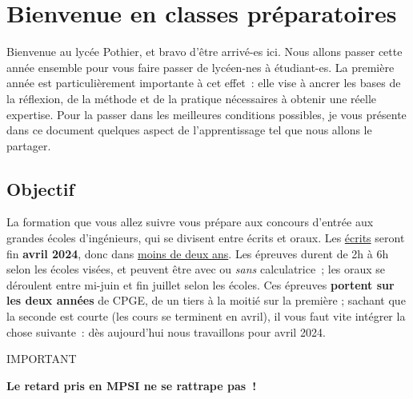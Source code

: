 \documentclass[a4paper, 12pt, final, garamond]{book}
\begin{document}
\setcounter{chapter}{-1}

\chapter*{Bienvenue en classes pr\'eparatoires}

Bienvenue au lycée Pothier, et bravo d'être arrivé-es ici. Nous allons passer
cette année ensemble pour vous faire passer de lycéen-nes à étudiant-es. La
première année est particulièrement importante à cet effet~: elle vise à ancrer
les bases de la réflexion, de la méthode et de la pratique nécessaires à obtenir
une réelle expertise. Pour la passer dans les meilleures conditions possibles,
je vous présente dans ce document quelques aspect de l'apprentissage tel que
nous allons le partager.

\section{Objectif}

\begin{tcbraster}[raster columns=4, raster equal height=rows]
    \begin{tcolorbox}[blankest, raster multicolumn=3]

        La formation que vous allez suivre vous prépare aux concours d'entrée
        aux grandes écoles d'ingénieurs, qui se divisent entre écrits et oraux.
        Les \underline{écrits} seront fin \textbf{avril 2024}, donc dans
        \underline{moins de deux ans}. Les épreuves durent de 2h à 6h selon les
        écoles visées, et peuvent être avec ou \textit{sans} calculatrice~; les
        oraux se déroulent entre mi-juin et fin juillet selon les écoles. Ces
        épreuves \textbf{portent sur les deux années} de CPGE, de un tiers à la
        moitié sur la première ; sachant que la seconde est courte (les cours se
        terminent en avril), il vous faut vite intégrer la chose suivante~: dès
        aujourd'hui nous travaillons pour avril 2024.

    \end{tcolorbox}
    \begin{NCror}[width=.5\linewidth]{IMPORTANT}
        \begin{center}
            \textbf{Le retard pris en MPSI ne se rattrape pas~!}
        \end{center}
    \end{NCror}
\end{tcbraster}
\end{document}
